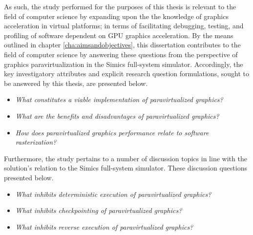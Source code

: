 As such, the study performed for the purposes of this thesis is relevant to the field of computer science by expanding upon the the knowledge of graphics acceleration in virtual platforms; in terms of facilitating debugging, testing, and profiling of software dependent on GPU graphics acceleration.
By the means outlined in chapter \ref{cha:aimsandobjectives}, this dissertation contributes to the field of computer science by answering these questions from the perspective of graphics paravirtualization in the Simics full-system simulator.
Accordingly, the key investigatory attributes and explicit research question formulations, sought to be answered by this thesis, are presented below.

\newcommand*\researchquestionitem[2]{\item[#1:] \textit{#2}}
\begin{itemize}[noitemsep]
	\researchquestionitem{1}{What constitutes a viable implementation of paravirtualized graphics?}
	\researchquestionitem{2}{What are the benefits and disadvantages of paravirtualized graphics?}
	\researchquestionitem{3}{How does paravirtualized graphics performance relate to software rasterization?}
\end{itemize}

Furthermore, the study pertains to a number of discussion topics in line with the solution's relation to the Simics full-system simulator. These discussion questions presented below.

\begin{itemize}[noitemsep]
	\researchquestionitem{1}{What inhibits deterministic execution of paravirtualized graphics?}
	\researchquestionitem{2}{What inhibits checkpointing of paravirtualized graphics?}
	\researchquestionitem{3}{What inhibits reverse execution of paravirtualized graphics?}
\end{itemize}

